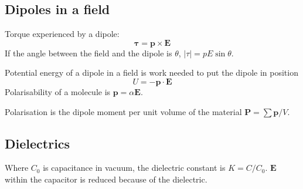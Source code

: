 \subsection*{Dipoles in a field}
Torque experienced by a dipole:
\begin{equation*}
    \mathbf{\tau} = \mathbf{p} \times \mathbf{E}
\end{equation*}
If the angle between the field and the dipole is $\theta$, $|\tau| = pE\sin \theta$.

Potential energy of a dipole in a field is work needed to put the dipole in position
\begin{equation*}
    U = - \mathbf{p} \cdot \mathbf{E}
\end{equation*}
Polarisability of a molecule is $\mathbf{p} = \alpha \mathbf{E}$.

Polarisation is the dipole moment per unit volume of the material $\mathbf{P} = \sum \mathbf{p} / V$.

\subsection*{Dielectrics}
Where $C_0$ is capacitance in vacuum, the dielectric constant is $K = C/C_0$. $\mathbf{E}$ within
the capacitor is reduced because of the dielectric.